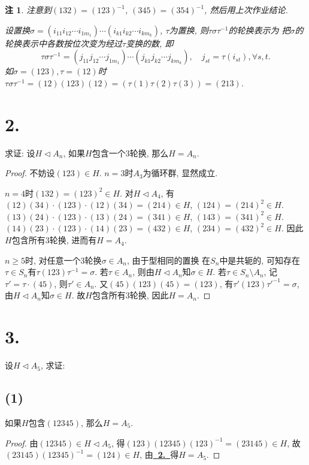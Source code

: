 \documentclass[12pt, a4paper, fontset=windows]{ctexart}
\newcommand{\myref}[2][]{\hyperref[#1]{\bf\color{blue}\ {#2}\ }}
\newtheorem*{remark}{注}
\begin{document}
\begin{remark}
注意到$(132)=(123)^{-1}$, $(345)=(354)^{-1}$, 然后用上次作业结论. 

设置换$\sigma=(i_{11}i_{12}\cdots 
i_{1m_1})\cdots(i_{k1}i_{k2}\cdots i_{km_k})$, 
$\tau$为置换, 则$\tau\sigma\tau^{-1}$的轮换表示为
把$\sigma$的轮换表示中各数按位次变为经过$\tau$变换的数, 即
\[\tau\sigma\tau^{-1}=(j_{11}j_{12}\cdots j_{1m_1})\cdots(j_{k1}j_{k2}\cdots j_{km_k}),
\quad j_{st}=\tau(i_{st}),\forall s,t.\]
如$\sigma=(123),\tau=(12)$时$\tau\sigma\tau^{-1}=
(12)(123)(12)=(\tau(1)\tau(2)\tau(3))=(213)$. 
\end{remark}

\section*{2.}
\label{tri-An}

求证: 设$H\lhd A_n$, 如果$H$包含一个3轮换, 那么$H=A_n$. 

\begin{proof}
不妨设$(123)\in H$. $n=3$时$A_3$为循环群, 显然成立. 

$n=4$时$(132)=(123)^2\in H$. 对$H\lhd A_4$, 有
$(12)(34)\cdot(123)\cdot(12)(34)=(214)\in H$, $(124)=(214)^2\in H$. 
$(13)(24)\cdot(123)\cdot(13)(24)=(341)\in H$, $(143)=(341)^2\in H$. 
$(14)(23)\cdot(123)\cdot(14)(23)=(432)\in H$, $(234)=(432)^2\in H$. 
因此$H$包含所有3轮换, 进而有$H=A_4$. 

$n\ge 5$时, 对任意一个3轮换$\sigma\in A_n$, 由于型相同的置换
在$S_n$中是共轭的, 可知存在$\tau\in S_n$有$\tau(123)\tau^{-1}=\sigma$. 
若$\tau\in A_n$, 则由$H\lhd A_n$知$\sigma\in H$. 
若$\tau\in S_n\setminus A_n$, 
记$\tau'=\tau\cdot(45)$, 则$\tau'\in A_n$. 
又$(45)(123)(45)=(123)$, 有$\tau'(123)\tau'^{-1}=\sigma$, 
由$H\lhd A_n$知$\sigma\in H$. 故$H$包含所有3轮换, 因此$H=A_n$. 
\end{proof}

\section*{3.}

设$H\lhd A_5$, 求证: 

\subsection*{(1)}

如果$H$包含$(12345)$, 那么$H=A_5$. 

\begin{proof}
由$(12345)\in H\lhd A_5$, 得$(123)(12345)(123)^{-1}=(23145)\in H$, 
故$(23145)(12345)^{-1}=(124)\in H$, 由\myref[tri-An]{2.}得$H=A_5$. 
\end{proof}
\end{document}
